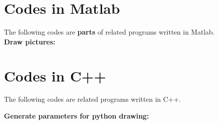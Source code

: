 \documentclass{mcmthesis}
\begin{document}
\begin{appendices}
    \section{Codes in Matlab}
    The following codes are \textbf{parts} of related programs written in Matlab.  \\
    
%    
     \textbf{Draw pictures:} 
     
    
    
    
    
    \section{Codes in C++}
    The following codes are related programs written in C++. \par
    \textbf{Generate parameters for python drawing:} 
    
    	
    \end{appendices}
\end{document}
